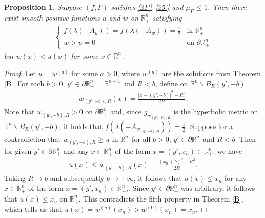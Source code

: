 \documentclass[12pt]{article}
\numberwithin{equation}{section}
\theoremstyle{plain}
\newtheorem{prop}[thm]{Proposition}
\theoremstyle{definition}
\begin{document}
\begin{appendices}
\begin{prop}\label{c1}
	Suppose $(f,\Gamma)$ satisfies \eqref{21'}--\eqref{25'} and $\mu_\Gamma^+ \leq 1$. Then there exist smooth positive functions $u$ and $w$ on $\mathbb{R}_+^n$ satisfying
	\begin{align*}
	\begin{cases}
	f(\lambda(-A_u)) = f(\lambda(-A_w)) = \frac{1}{2} & \text{in }\mathbb{R}_+^n \\
	w > u = 0 & \text{on }\partial\mathbb{R}_+^n
	\end{cases}
	\end{align*}
	but $w(x) < u(x)$ for some $x\in\mathbb{R}_+^n$. 
\end{prop}
\begin{proof}
	Let $u=w^{(a)}$ for some $a>0$, where $w^{(a)}$ are the solutions from Theorem \ref{B}. For each $b>0$, $y' \in\partial\mathbb{R}_+^n = \mathbb{R}^{n-1}$ and $R<b$, define on $\mathbb{R}^n\backslash B_R(y',-b)$ 
	\begin{align*}
	w_{(y', -b),R}(x) = \frac{|x-(y',-b)|^2 - R^2}{2R}.
	\end{align*}
	Note that $w_{(y', -b),R} > 0$ on $\partial\mathbb{R}_+^n$ and, since $g_{w_{(y', -b),R}}$ is the hyperbolic metric on $\mathbb{R}^n\backslash B_R(y',-b)$, it holds that $f(\lambda(-A_{w_{(y', -b),R}}))=\frac{1}{2}$. Suppose for a contradiction that $w_{(y', -b),R} \geq u$ in $\mathbb{R}_+^n$ for all $b>0$, $y' \in\partial\mathbb{R}_+^n$ and $R<b$. Then for given $y'\in\partial\mathbb{R}_+^n$ and any $x\in\mathbb{R}_+^n$ of the form $x=(y',x_n)\in\mathbb{R}^n_+$, we have
	\begin{align*}
	u(x) \leq w_{(y',-b),R}(x) = \frac{(x_n+b)^2 - R^2}{2R}.
	\end{align*}
	Taking $R\rightarrow b$ and subsequently $b\rightarrow+\infty$, it follows that $u(x) \leq x_n$ for any $x\in\mathbb{R}_+^n$ of the form $x=(y',x_n)\in\mathbb{R}^n_+$,. Since $y'\in\partial\mathbb{R}_+^n$ was arbitrary, it follows that $u(x) \leq x_n$ on $\mathbb{R}_+^n$. This contradicts the fifth property in Theorem \ref{B}, which tells us that $u(x) = w^{(a)}(x_n) > w^{(0)}(x_n) = x_n$.
\end{proof}


\end{appendices}
\end{document}
